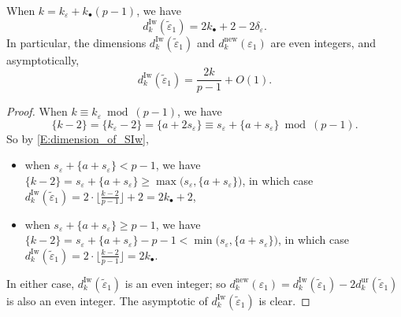 \begin{corollary}
    \label{C:dIw_is_even}
    When $k = k_\varepsilon + k_\bullet (p-1)$, we have
    $$
    d_{k}^{\mathrm{Iw}}(\tilde \varepsilon_1) = 2k_\bullet +2 -2 \delta_\varepsilon.
    $$
    In particular,
    the dimensions $d_{k}^{\mathrm{Iw}}(\tilde \varepsilon_1)$ and $d_{k}^{\mathrm{new}}(\varepsilon_1)$ are even integers, and asymptotically, $$d_k^{\mathrm{Iw}}(\tilde \varepsilon_1) = \frac{2k}{p-1}+O(1).$$
\end{corollary}

\begin{proof}
    When $k \equiv k_\varepsilon \bmod{(p-1)}$, we have
    $$\{k-2\} = \{k_\varepsilon-2\} = \{a+2s_\varepsilon\} \equiv s_\varepsilon + \{a+s_\varepsilon\} \bmod{(p-1)}.$$
    So by \eqref{E:dimension_of_SIw},
    \begin{itemize}
    \item when $s_\varepsilon+\{a+s_\varepsilon\}<p-1$, we have $\{k-2\} = s_\varepsilon+\{a+s_\varepsilon\} \geq \max\big( s_\varepsilon, \{a+s_\varepsilon\}\big)$, in which case $d_{k}^{\mathrm{Iw}}(\tilde \varepsilon_1) = 2 \cdot \big\lfloor \frac{k-2}{p-1}\big\rfloor +2 =2k_\bullet +2$,
    \item when $s_\varepsilon+\{a+s_\varepsilon\} \geq p-1$, we have $\{k-2\} = s_\varepsilon+\{a+s_\varepsilon\} - p-1< \min\big( s_\varepsilon, \{a+s_\varepsilon\} \big)$, in which case $d_{k}^{\mathrm{Iw}}(\tilde \varepsilon_1) = 2 \cdot \big\lfloor \frac{k-2}{p-1}\big\rfloor =2 k_\bullet $.
    \end{itemize}
    In either case, $d_{k}^{\mathrm{Iw}}(\tilde \varepsilon_1)$ is an even integer; so $d_{k}^{\textrm{new}}(\varepsilon_1) = d_{k}^{\mathrm{Iw}}(\tilde \varepsilon_1)- 2 d_{k}^{\mathrm{ur}}(\tilde \varepsilon_1)$ is also an even integer.
    The asymptotic of $d_{k}^{\mathrm{Iw}}(\tilde \varepsilon_1)$ is clear.
\end{proof}

